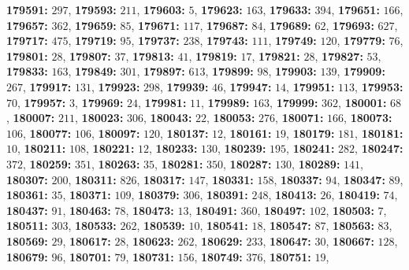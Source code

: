 \textsf{\bfseries 179591:} $297$, \textsf{\bfseries 179593:} $211$, \textsf{\bfseries 179603:} $5$, \textsf{\bfseries 179623:} $163$, \textsf{\bfseries 179633:} $394$, \textsf{\bfseries 179651:} $166$, \textsf{\bfseries 179657:} $362$, \textsf{\bfseries 179659:} $85$, \textsf{\bfseries 179671:} $117$, \textsf{\bfseries 179687:} $84$, \textsf{\bfseries 179689:} $62$, \textsf{\bfseries 179693:} $627$, \textsf{\bfseries 179717:} $475$, \textsf{\bfseries 179719:} $95$, \textsf{\bfseries 179737:} $238$, \textsf{\bfseries 179743:} $111$, \textsf{\bfseries 179749:} $120$, \textsf{\bfseries 179779:} $76$, \textsf{\bfseries 179801:} $28$, \textsf{\bfseries 179807:} $37$, \textsf{\bfseries 179813:} $41$, \textsf{\bfseries 179819:} $17$, \textsf{\bfseries 179821:} $28$, \textsf{\bfseries 179827:} $53$, \textsf{\bfseries 179833:} $163$, \textsf{\bfseries 179849:} $301$, \textsf{\bfseries 179897:} $613$, \textsf{\bfseries 179899:} $98$, \textsf{\bfseries 179903:} $139$, \textsf{\bfseries 179909:} $267$, \textsf{\bfseries 179917:} $131$, \textsf{\bfseries 179923:} $298$, \textsf{\bfseries 179939:} $46$, \textsf{\bfseries 179947:} $14$, \textsf{\bfseries 179951:} $113$, \textsf{\bfseries 179953:} $70$, \textsf{\bfseries 179957:} $3$, \textsf{\bfseries 179969:} $24$, \textsf{\bfseries 179981:} $11$, \textsf{\bfseries 179989:} $163$, \textsf{\bfseries 179999:} $362$, \textsf{\bfseries 180001:} $68$, \textsf{\bfseries 180007:} $211$, \textsf{\bfseries 180023:} $306$, \textsf{\bfseries 180043:} $22$, \textsf{\bfseries 180053:} $276$, \textsf{\bfseries 180071:} $166$, \textsf{\bfseries 180073:} $106$, \textsf{\bfseries 180077:} $106$, \textsf{\bfseries 180097:} $120$, \textsf{\bfseries 180137:} $12$, \textsf{\bfseries 180161:} $19$, \textsf{\bfseries 180179:} $181$, \textsf{\bfseries 180181:} $10$, \textsf{\bfseries 180211:} $108$, \textsf{\bfseries 180221:} $12$, \textsf{\bfseries 180233:} $130$, \textsf{\bfseries 180239:} $195$, \textsf{\bfseries 180241:} $282$, \textsf{\bfseries 180247:} $372$, \textsf{\bfseries 180259:} $351$, \textsf{\bfseries 180263:} $35$, \textsf{\bfseries 180281:} $350$, \textsf{\bfseries 180287:} $130$, \textsf{\bfseries 180289:} $141$, \textsf{\bfseries 180307:} $200$, \textsf{\bfseries 180311:} $826$, \textsf{\bfseries 180317:} $147$, \textsf{\bfseries 180331:} $158$, \textsf{\bfseries 180337:} $94$, \textsf{\bfseries 180347:} $89$, \textsf{\bfseries 180361:} $35$, \textsf{\bfseries 180371:} $109$, \textsf{\bfseries 180379:} $306$, \textsf{\bfseries 180391:} $248$, \textsf{\bfseries 180413:} $26$, \textsf{\bfseries 180419:} $74$, \textsf{\bfseries 180437:} $91$, \textsf{\bfseries 180463:} $78$, \textsf{\bfseries 180473:} $13$, \textsf{\bfseries 180491:} $360$, \textsf{\bfseries 180497:} $102$, \textsf{\bfseries 180503:} $7$, \textsf{\bfseries 180511:} $303$, \textsf{\bfseries 180533:} $262$, \textsf{\bfseries 180539:} $10$, \textsf{\bfseries 180541:} $18$, \textsf{\bfseries 180547:} $87$, \textsf{\bfseries 180563:} $83$, \textsf{\bfseries 180569:} $29$, \textsf{\bfseries 180617:} $28$, \textsf{\bfseries 180623:} $262$, \textsf{\bfseries 180629:} $233$, \textsf{\bfseries 180647:} $30$, \textsf{\bfseries 180667:} $128$, \textsf{\bfseries 180679:} $96$, \textsf{\bfseries 180701:} $79$, \textsf{\bfseries 180731:} $156$, \textsf{\bfseries 180749:} $376$, \textsf{\bfseries 180751:} $19$, 
